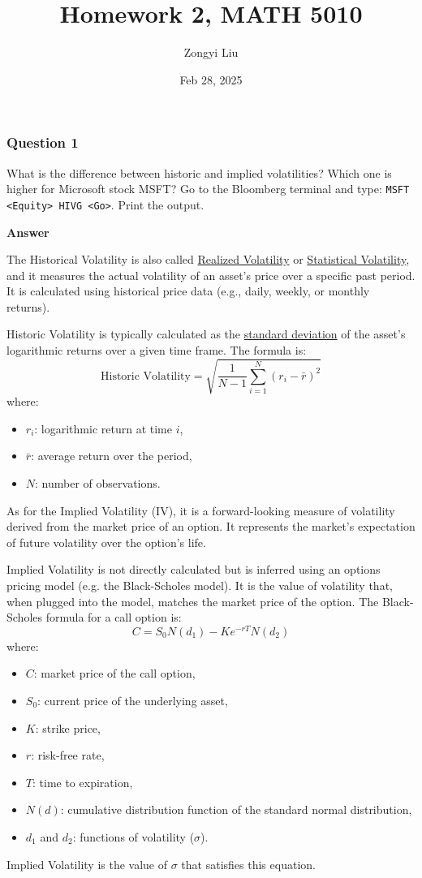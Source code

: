 \documentclass[letterpaper]{article}
\title{Homework 2, MATH 5010}
\author{Zongyi Liu}
\date{Feb 28, 2025}
\begin{document}
		\maketitle
		
		\subsubsection*{Question 1}
		What is the difference between historic and implied volatilities? Which one is higher for Microsoft stock MSFT? Go to the Bloomberg terminal and type: \texttt{MSFT <Equity> HIVG <Go>}. Print the output.
		
		\textbf{Answer}
		
		 
		 The Historical Volatility is also called \underline{Realized Volatility} or \underline{Statistical Volatility}, and it measures the actual volatility of an asset's price over a specific past period. It is calculated using historical price data (e.g., daily, weekly, or monthly returns).
				
				Historic Volatility is typically calculated as the \underline{standard deviation} of the asset's logarithmic returns over a given time frame. The formula is:
				\[
				\text{Historic Volatility} = \sqrt{\frac{1}{N-1} \sum_{i=1}^{N} (r_i - \bar{r})^2}
				\]
				where:
				\begin{itemize}
					\item \( r_i \): logarithmic return at time \( i \),
					\item \( \bar{r} \): average return over the period,
					\item \( N \): number of observations.
				\end{itemize}
				
			
			As for the Implied Volatility (IV), it is a forward-looking measure of volatility derived from the market price of an option. It represents the market's expectation of future volatility over the option's life.
				
			
			Implied Volatility is not directly calculated but is inferred using an options pricing model (e.g. the Black-Scholes model). It is the value of volatility that, when plugged into the model, matches the market price of the option. The Black-Scholes formula for a call option is:
				\[
				C = S_0 N(d_1) - K e^{-rT} N(d_2)
				\]
				where:
				
				\begin{itemize}
					\item \( C \): market price of the call option,
					\item \( S_0 \): current price of the underlying asset,
					\item \( K \): strike price,
					\item \( r \): risk-free rate,
					\item \( T \): time to expiration,
					\item \( N(d) \): cumulative distribution function of the standard normal distribution,
					\item \( d_1 \) and \( d_2 \): functions of volatility (\( \sigma \)).
				\end{itemize}
				Implied Volatility is the value of \( \sigma \) that satisfies this equation.
				
\end{document}
